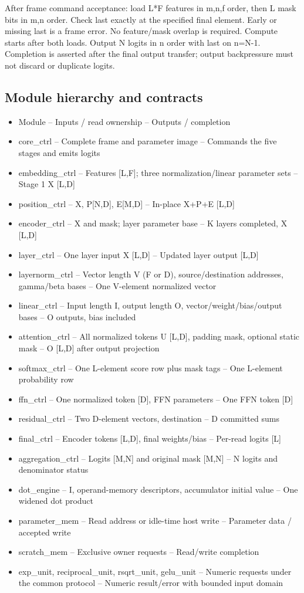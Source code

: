 \documentclass[11pt,a4paper]{article}
\begin{document}
After frame command acceptance: load L*F features in m,n,f order, then L mask bits in m,n order. Check last exactly at the specified final element. Early or missing last is a frame error. No feature/mask overlap is required. Compute starts after both loads. Output N logits in n order with last on n=N-1. Completion is asserted after the final output transfer; output backpressure must not discard or duplicate logits.

\subsection{Module hierarchy and contracts}

\begin{itemize}
\item Module -- Inputs / read ownership -- Outputs / completion
\item core\_ctrl -- Complete frame and parameter image -- Commands the five stages and emits logits
\item embedding\_ctrl -- Features [L,F]; three normalization/linear parameter sets -- Stage 1 X [L,D]
\item position\_ctrl -- X, P[N,D], E[M,D] -- In-place X+P+E [L,D]
\item encoder\_ctrl -- X and mask; layer parameter base -- K layers completed, X [L,D]
\item layer\_ctrl -- One layer input X [L,D] -- Updated layer output [L,D]
\item layernorm\_ctrl -- Vector length V (F or D), source/destination addresses, gamma/beta bases -- One V-element normalized vector
\item linear\_ctrl -- Input length I, output length O, vector/weight/bias/output bases -- O outputs, bias included
\item attention\_ctrl -- All normalized tokens U [L,D], padding mask, optional static mask -- O [L,D] after output projection
\item softmax\_ctrl -- One L-element score row plus mask tags -- One L-element probability row
\item ffn\_ctrl -- One normalized token [D], FFN parameters -- One FFN token [D]
\item residual\_ctrl -- Two D-element vectors, destination -- D committed sums
\item final\_ctrl -- Encoder tokens [L,D], final weights/bias -- Per-read logits [L]
\item aggregation\_ctrl -- Logits [M,N] and original mask [M,N] -- N logits and denominator status
\item dot\_engine -- I, operand-memory descriptors, accumulator initial value -- One widened dot product
\item parameter\_mem -- Read address or idle-time host write -- Parameter data / accepted write
\item scratch\_mem -- Exclusive owner requests -- Read/write completion
\item exp\_unit, reciprocal\_unit, rsqrt\_unit, gelu\_unit -- Numeric requests under the common protocol -- Numeric result/error with bounded input domain
\end{itemize}
\end{document}

